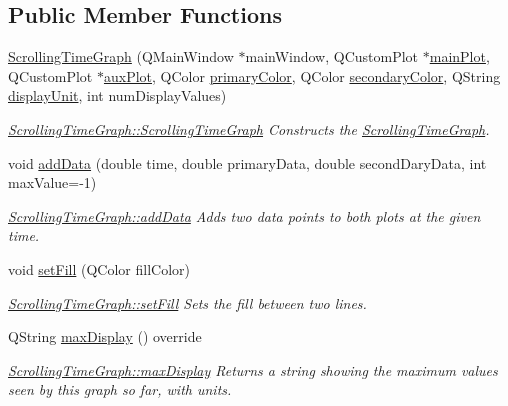 \subsection*{Public Member Functions}
\begin{DoxyCompactItemize}
\item 
\hyperlink{class_scrolling_time_graph_ac7af242514d5770d99d90743a24163ca}{Scrolling\+Time\+Graph} (Q\+Main\+Window $\ast$main\+Window, Q\+Custom\+Plot $\ast$\hyperlink{class_graph_a02239013b745a7c1411a7f8623cc2073}{main\+Plot}, Q\+Custom\+Plot $\ast$\hyperlink{class_graph_ac7d10642e5439fd87d7d4bc5a33e643d}{aux\+Plot}, Q\+Color \hyperlink{class_graph_ab42ef887ac4d6bad01cc0c2c3609ab6b}{primary\+Color}, Q\+Color \hyperlink{class_graph_a7bda51c2c124dfe46d5ee515a2508511}{secondary\+Color}, Q\+String \hyperlink{class_graph_a28488c31277fec31c8d54a44860efede}{display\+Unit}, int num\+Display\+Values)
\begin{DoxyCompactList}\small\item\em \hyperlink{class_scrolling_time_graph_ac7af242514d5770d99d90743a24163ca}{Scrolling\+Time\+Graph\+::\+Scrolling\+Time\+Graph} Constructs the \hyperlink{class_scrolling_time_graph}{Scrolling\+Time\+Graph}. \end{DoxyCompactList}\item 
void \hyperlink{class_scrolling_time_graph_af26f732b60d98c521ea93709db8f70cc}{add\+Data} (double time, double primary\+Data, double second\+Dary\+Data, int max\+Value=-\/1)
\begin{DoxyCompactList}\small\item\em \hyperlink{class_scrolling_time_graph_af26f732b60d98c521ea93709db8f70cc}{Scrolling\+Time\+Graph\+::add\+Data} Adds two data points to both plots at the given time. \end{DoxyCompactList}\item 
void \hyperlink{class_scrolling_time_graph_a651e6922d732be7084c207cc94257bd7}{set\+Fill} (Q\+Color fill\+Color)
\begin{DoxyCompactList}\small\item\em \hyperlink{class_scrolling_time_graph_a651e6922d732be7084c207cc94257bd7}{Scrolling\+Time\+Graph\+::set\+Fill} Sets the fill between two lines. \end{DoxyCompactList}\item 
Q\+String \hyperlink{class_scrolling_time_graph_a3d0314f268e3eeb7396733147f710ef0}{max\+Display} () override
\begin{DoxyCompactList}\small\item\em \hyperlink{class_scrolling_time_graph_a3d0314f268e3eeb7396733147f710ef0}{Scrolling\+Time\+Graph\+::max\+Display} Returns a string showing the maximum values seen by this graph so far, with units. \end{DoxyCompactList}\item 

\end{DoxyCompactItemize}
